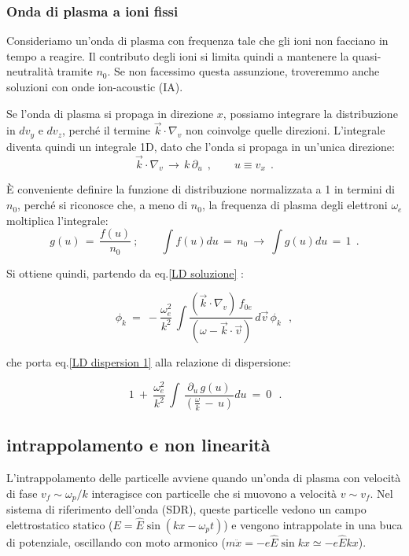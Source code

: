 %

\subsubsection{Onda di plasma a ioni fissi}

Consideriamo un'onda di plasma con frequenza tale che gli ioni non facciano in tempo a reagire. Il contributo degli ioni si limita quindi a mantenere la quasi-neutralità tramite \(n_0\). Se non facessimo questa assunzione, troveremmo anche soluzioni con onde ion-acoustic (IA).

Se l'onda di plasma si propaga in direzione \(x\), possiamo integrare la distribuzione in \(dv_y\) e \(dv_z\), perché il termine \(\vec{k} \cdot \nabla_v\) non coinvolge quelle direzioni. L'integrale diventa quindi un integrale 1D, dato che l'onda si propaga in un'unica direzione:
\[
\vec{k} \cdot \nabla_v\, \to\, k\, \partial_u\ \ , \qquad u \equiv v_x\ \ .
\]

È conveniente definire la funzione di distribuzione normalizzata a 1 in termini di \(n_0\), perché si riconosce che, a meno di \(n_0\), la frequenza di plasma degli elettroni \(\omega_e\) moltiplica l'integrale:
\[
g(u)\, =\, \frac{f(u)}{n_0}\ ; \qquad \int f(u) du\, =\, n_0\ \to\ \int g(u) du\, =\, 1\ \ .
\]

Si ottiene quindi, partendo da eq.\ref{LD soluzione} :

\[
\phi_k\ =\ -\frac{\omega_e^2}{k^2}\, \int \frac{(\vec{k} \cdot \nabla_v)\, f_{0e}}{(\omega - \vec{k} \cdot \vec{v})}\, d\vec{v} \, \phi_k\ \ \ ,
\]

che porta eq.\ref{LD dispersion 1} alla relazione di dispersione:

\begin{equation}
	\label{LD dispersion 2}
	\boxed{\,1 \ +\ \frac{\omega_e^2}{k^2}\, \int\, \frac{\partial_u\, g(u)}{\left(\frac{\omega}{k}\, -\, u\right)} du\ =\ 0}\ \ \ .
\end{equation}




%
%
%
\subsection{intrappolamento e non linearità} 

L'intrappolamento delle particelle avviene quando un'onda di plasma con velocità di fase \(v_f \sim \omega_p/k\) interagisce con particelle che si muovono a velocità \(v \sim v_f\). Nel sistema di riferimento dell'onda (SDR), queste particelle vedono un campo elettrostatico statico ($E=\hat E\sin(kx-\omega_pt)$) e vengono intrappolate in una buca di potenziale, oscillando con moto armonico ($m\ddot x=-e\hat E\sin kx \simeq -e\hat Ekx$).

